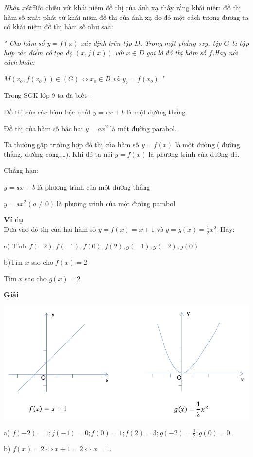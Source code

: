 \documentclass[12pt,oneside,a4paper,reqno]{book}
\begin{document}
\textit{Nhận xét}:Đối chiếu với khái niệm đồ thị của ánh xạ thấy rằng khái niệm đồ thị hàm số xuất phát từ khái niệm đồ thị của ánh xạ do đó một cách tương đương ta có khái niệm đồ thị hàm số như sau:

\textit{" Cho hàm số $y=f(x)$ xác định trên tập $D$. Trong mặt phẳng oxy, tập $G$ là tập hợp các điểm có tọa độ $(x,f(x))$ với $x \in D$ gọi là đồ thị hàm số $f$.Hay nói cách khác: }

\textit{
 $M\left(x_{o},f(x_{o})\right) \in (G) \Longleftrightarrow x_{o} \in D$ và $y_{o}=f(x_{o})$ "}
 
Trong SGK lớp 9 ta đã biết :

 Đồ thị của các hàm bậc nhất $y=ax+b$ là một đường thẳng.
 
 Đồ thị của hàm số bậc hai $y=ax^2$ là một đường parabol.
 
Ta thường gặp trường hợp đồ thị của hàm số $y=f(x)$ là một đường ( đường thẳng, đường cong,…). Khi đó ta nói $y=f(x)$ là phương trình của đường đó.

Chẳng hạn:

$y=ax+b$ là phương trình của một đường thẳng

$y=ax^2 (a \neq 0)$ là phương trình của một đường parabol

{\bf Ví dụ}\\ Dựa vào đồ thị của hai hàm số $y=f(x)=x+1$ và $y=g(x)=\frac{1}{2} x^2$. Hãy:

a) Tính $f(-2),f(-1),f(0),f(2),g(-1),g(-2),g(0)$

b)Tìm $x$ sao cho $f(x)=2$

   Tìm $x$ sao cho $g(x)=2$
   
{\bf Giải}

\includegraphics[scale=.6]{hinh9}

a) $f(-2)=1;f(-1)=0;f(0)=1;f(2)=3;g(-2)=\frac{1}{2};g(0)=0.$

b) $f(x)=2 \Leftrightarrow x+1=2 \Leftrightarrow x=1$.
\end{document}
